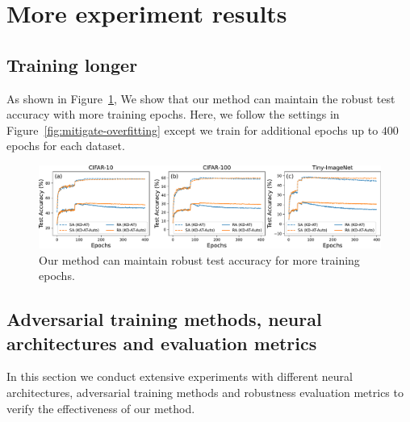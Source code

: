 \section{More experiment results}


\subsection{Training longer}
As shown in Figure~\ref{fig:Longer-training}, We show that our method can maintain the robust test accuracy with more training epochs. Here, we follow the settings in Figure~\ref{fig:mitigate-overfitting} except we train for additional epochs up to $400$ epochs for each dataset.

\begin{figure}[t]
  \centering
  \includegraphics[width=0.98\linewidth]{figures/longer-training.pdf}
  \vspace{-1ex}
  \caption{Our method can maintain robust test accuracy for more training epochs. 
  }
\label{fig:Longer-training}
\end{figure}



\subsection{Adversarial training methods, neural architectures and evaluation metrics}
\label{sect:more-result}

In this section we conduct extensive experiments with different neural architectures, adversarial training methods and robustness evaluation metrics to verify the effectiveness of our method.



